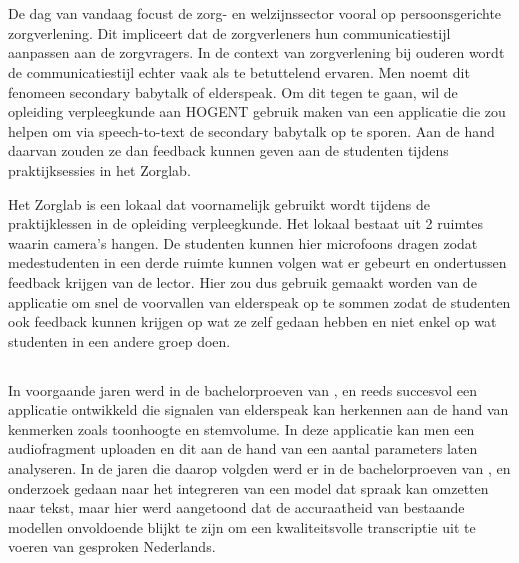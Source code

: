 
\chapter{}%
\label{ch:inleiding}

De dag van vandaag focust de zorg- en welzijnssector vooral op persoonsgerichte zorgverlening. Dit impliceert dat de zorgverleners hun communicatiestijl aanpassen aan de zorgvragers. In de context van zorgverlening bij ouderen wordt de communicatiestijl echter vaak als te betuttelend ervaren. Men noemt dit fenomeen secondary babytalk of elderspeak. Om dit tegen te gaan, wil de opleiding verpleegkunde aan HOGENT gebruik maken van een applicatie die zou helpen om via speech-to-text de secondary babytalk op te sporen. Aan de hand daarvan zouden ze dan feedback kunnen geven aan de studenten tijdens praktijksessies in het Zorglab.

Het Zorglab is een lokaal dat voornamelijk gebruikt wordt tijdens de praktijklessen in de opleiding verpleegkunde. Het lokaal bestaat uit 2 ruimtes waarin camera's hangen. De studenten kunnen hier microfoons dragen zodat medestudenten in een derde ruimte kunnen volgen wat er gebeurt en ondertussen feedback krijgen van de lector. Hier zou dus gebruik gemaakt worden van de applicatie om snel de voorvallen van elderspeak op te sommen zodat de studenten ook feedback kunnen krijgen op wat ze zelf gedaan hebben en niet enkel op wat studenten in een andere groep doen.

\section{}%
\label{sec:probleemstelling}

In voorgaande jaren werd in de bachelorproeven van \textcite{Govaerts2022}, \textcite{Gussem2022} en \textcite{Daems2023} reeds succesvol een applicatie ontwikkeld die signalen van elderspeak kan herkennen aan de hand van kenmerken zoals toonhoogte en stemvolume. In deze applicatie kan men een audiofragment uploaden en dit aan de hand van een aantal parameters laten analyseren. In de jaren die daarop volgden werd er in de bachelorproeven van \textcite{Branden2024}, \textcite{Coetsiers2024} en \textcite{Schryver2024} onderzoek gedaan naar het integreren van een model dat spraak kan omzetten naar tekst, maar hier werd aangetoond dat de accuraatheid van bestaande modellen onvoldoende blijkt te zijn om een kwaliteitsvolle transcriptie uit te voeren van gesproken Nederlands.

